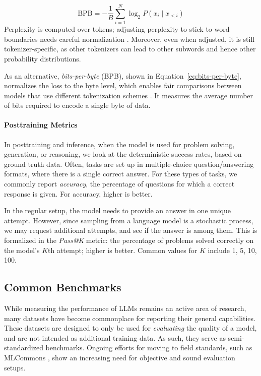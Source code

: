 \begin{equation}
    \text{BPB} = - \frac{1}{B} \sum_{i=1}^N \log_2 P(x_i \mid x_{<i})
    \label{eq:bits-per-byte}
\end{equation}
Perplexity is computed over tokens; adjusting perplexity to stick to word boundaries needs careful normalization \citep{pimentel-meister-2024-compute}. Moreover, even when adjusted, it is still tokenizer-specific, as other tokenizers can lead to other subwords and hence other probability distributions. 

As an alternative, \emph{bits-per-byte} (BPB), shown in Equation~\ref{eq:bits-per-byte}, normalizes the loss to the byte level, which enables fair comparisons between models that use different tokenization schemes \citep{borgeaud2022improving}. It measures the average number of bits required to encode a single byte of data.

\paragraph{Posttraining Metrics}
In posttraining and inference,  when the model is used for problem solving, generation, or reasoning, we look at the deterministic success rates, based on ground truth data. Often, tasks are set up in multiple-choice question/answering formats, where there is a single correct answer. For these types of tasks, we commonly report {\em accuracy}, the percentage of questions for which a correct response is given. For accuracy, higher is better. 

In the regular setup, the model needs to provide an answer in one unique attempt. However, since sampling from a language model is a stochastic process, we may request additional attempts, and see if the answer is among them. This is formalized in the {\em Pass@K} metric: the percentage of problems solved correctly on the model's $K$th attempt; higher is better. Common values for $K$ include 1, 5, 10, 100. 

  

\subsection{Common Benchmarks}
While measuring the performance of LLMs remains an active area of research, many datasets have become commonplace for reporting their general capabilities. These datasets are designed to only be used for {\em evaluating} the quality of a model, and are not intended as additional training data. As such, they serve as semi-standardized benchmarks. Ongoing efforts for moving to field standards, such as MLCommons \citep{thiyagalingam2022ai}, show an increasing need for objective and sound evaluation setups. 


